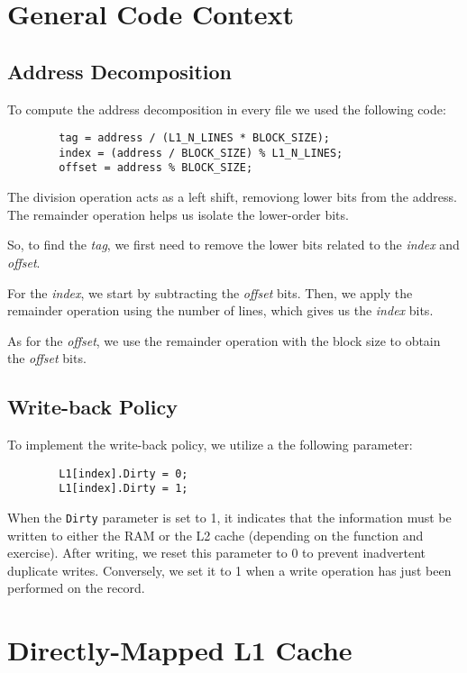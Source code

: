 \documentclass[12pt]{article}
\begin{document}
    \section{General Code Context}
    
    \subsection{Address Decomposition}
    To compute the address decomposition in every file we used the following code:

    \begin{verbatim}
        tag = address / (L1_N_LINES * BLOCK_SIZE);
        index = (address / BLOCK_SIZE) % L1_N_LINES;
        offset = address % BLOCK_SIZE;
    \end{verbatim}

    The division operation acts as a left shift, removiong lower bits from the address. The remainder operation helps us 
     isolate the lower-order bits.

    So, to find the \textit{tag}, we first need to remove the lower bits related to the \textit{index} and \textit{offset}. 
    
    For the \textit{index}, we start by subtracting the \textit{offset} bits. Then, we apply the remainder operation using the number of lines, 
     which gives us the \textit{index} bits.
     
    As for the \textit{offset}, we use the remainder operation with the block size to obtain the \textit{offset} bits.

    \subsection{Write-back Policy}
    To implement the write-back policy, we utilize a the following parameter:

    \begin{verbatim}
        L1[index].Dirty = 0;
        L1[index].Dirty = 1;
    \end{verbatim}

    When the \texttt{Dirty} parameter is set to 1, it indicates that the information must be written to either the RAM or the L2 cache (depending on the function and exercise).
     After writing, we reset this parameter to 0 to prevent inadvertent duplicate writes. Conversely, we set it to 1 when a write operation has just been performed on 
     the record.

    \section{Directly-Mapped L1 Cache}\label{L1_cache}
\end{document}

